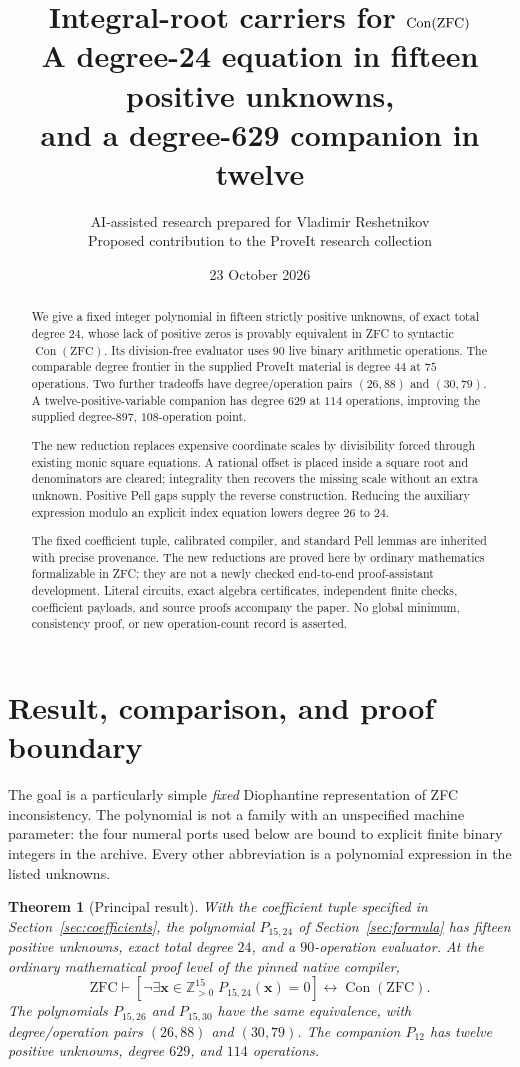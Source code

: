 \documentclass[11pt,a4paper]{article}
\title{Integral-root carriers for $\Con(\ZFC)$\\[4pt]
\large A degree-24 equation in fifteen positive unknowns,\\
and a degree-629 companion in twelve}
\author{AI-assisted research prepared for Vladimir Reshetnikov\\
\small Proposed contribution to the ProveIt research collection}
\date{23 October 2026}
\newtheorem{theorem}{Theorem}[section]
\theoremstyle{remark}
\newcommand{\Zp}{\mathbb Z_{>0}}
\newcommand{\Con}{\operatorname{Con}}
\newcommand{\ZFC}{\mathrm{ZFC}}
\newcommand{\Ptwo}{P_{15,24}}
\newcommand{\Pthree}{P_{15,26}}
\newcommand{\Pone}{P_{15,30}}
\begin{document}
\maketitle
\begin{abstract}
We give a fixed integer polynomial in fifteen strictly positive unknowns,
of exact total degree $24$, whose lack of positive zeros is provably equivalent
in ZFC to syntactic $\Con(\ZFC)$. Its division-free evaluator uses $90$ live
binary arithmetic operations. The comparable degree frontier in the supplied
ProveIt material is degree $44$ at $75$ operations. Two further tradeoffs have
degree/operation pairs $(26,88)$ and $(30,79)$. A twelve-positive-variable
companion has degree $629$ at $114$ operations, improving the supplied
degree-$897$, $108$-operation point.

The new reduction replaces expensive coordinate scales by divisibility
forced through existing monic square equations. A rational offset is placed
inside a square root and denominators are cleared; integrality then recovers
the missing scale without an extra unknown. Positive Pell gaps supply the
reverse construction. Reducing the auxiliary expression modulo an explicit
index equation lowers degree $26$ to $24$.

The fixed coefficient tuple, calibrated compiler, and standard Pell lemmas
are inherited with precise provenance. The new reductions are proved here
by ordinary mathematics formalizable in ZFC; they are not a newly checked
end-to-end proof-assistant development. Literal circuits, exact algebra
certificates, independent finite checks, coefficient payloads, and source
proofs accompany the paper. No global minimum, consistency proof, or new
operation-count record is asserted.
\end{abstract}

\clearpage
\tableofcontents
\newpage

\section{Result, comparison, and proof boundary}
\label{sec:scope}

The goal is a particularly simple \emph{fixed} Diophantine representation of
ZFC inconsistency. The polynomial is not a family with an unspecified
machine parameter: the four numeral ports used below are bound to explicit
finite binary integers in the archive. Every other abbreviation is a
polynomial expression in the listed unknowns.

\begin{theorem}[Principal result]
\label{thm:main}
With the coefficient tuple specified in Section~\ref{sec:coefficients}, the
polynomial $\Ptwo$ of Section~\ref{sec:formula} has fifteen positive unknowns,
exact total degree $24$, and a $90$-operation evaluator. At the ordinary
mathematical proof level of the pinned native compiler,
\[
 \ZFC\vdash
 \left[\neg\exists\mathbf x\in\Zp^{15}\;\Ptwo(\mathbf x)=0\right]
 \longleftrightarrow\Con(\ZFC).
\]
The polynomials $\Pthree$ and $\Pone$ have the same equivalence, with
degree/operation pairs $(26,88)$ and $(30,79)$. The companion $P_{12}$ has
twelve positive unknowns, degree $629$, and $114$ operations.
\end{theorem}
\end{document}
